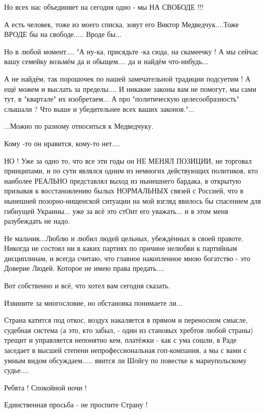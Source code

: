 Но всех нас объединяет на сегодня одно - мы НА СВОБОДЕ !!! 

А есть человек, тоже из моего списка, зовут его Виктор Медведчук....Тоже ВРОДЕ
бы на свободе..... Вроде бы... 

Но в любой момент.... "А ну-ка, присядьте -ка сюда, на скамеечку ! А мы сейчас
вашу семейку возьмём да и обыщем.... да и найдём что-нибудь...

А не найдём, так порошочек по нашей замечательной традиции подсуетим ! А ещё
можем и выслать за пределы.... И никакие законы вам не помогут, мы сами тут, в
"квартале" их изобретаем... А про "политическую целесообразность" слышали ? Что
выше и убедительнее всех ваших законов."...

...Можно по разному относиться к Медведчуку. 

Кому -то он нравится, кому-то нет....

НО ! Уже за одно то, что все эти годы он НЕ МЕНЯЛ ПОЗИЦИИ, не торговал
принципами, и по сути являлся одним из немногих действующих политиков, кто
наиболее РЕАЛЬНО представлял выход из нынешнего бардака, в открытую призывая к
восстановлению былых НОРМАЛЬНЫХ связей с Россией, что в нынешней
позорно-нищенской ситуации на мой взгляд явилось бы спасением для гибнущей
Украины... уже за всё это стОит его уважать... и в этом меня разубеждать не
надо. 

Не мальчик...Люблю и любил людей цельных, убеждённых в своей правоте. Никогда
не состоял ни в каких партиях по причине нелюбви к партийным дисциплинам, и
всегда считаю, что главное накопленное мною богатство - это Доверие Людей.
Которое не имею права предать....

Вот собственно и всё, что хотел вам сегодня сказать. 

Извините за многословие, но обстановка понимаете ли... 

Страна катится под откос, воздух накаляется в прямом и переносном смысле,
судебная система (а это, кто забыл, - один из становых хребтов любой страны)
трещит и управляется непонятно кем, платёжки - как с ума сошли, в Раде заседает
в высшей степени непрофессиональная гоп-компания, а мы с вами с умным видом
обсуждаем.....  явится ли Шойгу по повестке к мариупольскому судье....

Ребята ! Спокойной ночи ! 

Единственная просьба - не проспите Страну !
